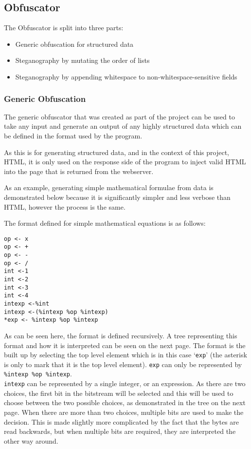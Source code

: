 \subsection{Obfuscator}
The Obfuscator is split into three parts:
\begin{itemize}
    \item Generic obfuscation for structured data
    \item Steganography by mutating the order of lists
    \item Steganography by appending whitespace to non-whitespace-sensitive fields
\end{itemize}

\subsubsection{Generic Obfuscation}
The generic obfuscator that was created as part of the project can be used to take any input and generate an output of any highly structured data which can be defined in the format used by the program.\par
As this is for generating structured data, and in the context of this project, HTML, it is only used on the response side of the program to inject valid HTML into the page that is returned from the webserver.\par
As an example, generating simple mathematical formulae from data is demonstrated below because it is significantly simpler and less verbose than HTML, however the process is the same.\par
The format defined for simple mathematical equations is as follows:
\begin{lstlisting}[language=pagefile]
op <- x
op <- +
op <- -
op <- /
int <-1
int <-2
int <-3
int <-4
intexp <-%int
intexp <-(%intexp %op %intexp)
*exp <- %intexp %op %intexp
\end{lstlisting}

As can be seen here, the format is defined recursively. A tree representing this format and how it is interpreted can be seen on the next page.
The format is the built up by selecting the top level element which is in this case `\texttt{exp}' (the asterisk is only to mark that it is the top level element).
\texttt{exp} can only be represented by \texttt{\%intexp \%op \%intexp}. \\
\texttt{intexp} can be represented by a single integer, or an expression.
As there are two choices, the first bit in the bitstream will be selected and this will be used to choose between the two possible choices, as demonstrated in the tree on the next page.
When there are more than two choices, multiple bits are used to make the decision.
This is made slightly more complicated by the fact that the bytes are read backwards, but when multiple bits are required, they are interpreted the other way around.

